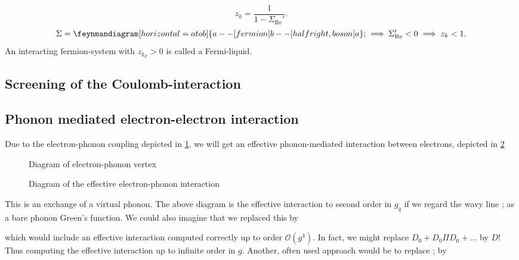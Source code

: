 \begin{equation} 
z_k = \frac{1}{1-\Sigma_{\text{Re}}'}.
\end{equation}
\begin{equation} 
\Sigma = \begin{gathered}
\feynmandiagram[horizontal=a to b]{a--[fermion] b --[half right, boson] a};
\end{gathered} \implies\Sigma_{\text{Re}}' <0 \implies z_k <1.
\end{equation}
An interacting fermion-system with $z_{k_F}>0$ is called a Fermi-liquid. 









\subsection{Screening of the Coulomb-interaction}

\subsection{Phonon mediated electron-electron interaction}

Due to the electron-phonon coupling depicted in \cref{fig:el-ph-vertex}, we will get an effective phonon-mediated interaction between electrons, depicted in \cref{fig:el-ph-interaction}

\begin{figure}
	\centering
	
	\caption{Diagram of electron-phonon vertex}
	\label{fig:el-ph-vertex}
\end{figure}


\begin{figure}
	\centering
	
	\caption{Diagram of the effective electron-phonon interaction}
	\label{fig:el-ph-interaction}
\end{figure}


This is an exchange of a virtual phonon. The above diagram is the effective interaction to second order in $g_q$ if we regard the wavy line ; as a bare phonon Green's function. We could also imagine that we replaced this by

which would include an effective interaction computed correctly up to order $\mathcal{O}(g^4)$. In fact, we might replace $D_0 + D_0\Pi D_0 +\dots$ by $D!$ Thus computing the effective interaction up to infinite order in $g$. Another, often used approach would be to replace ; by  

